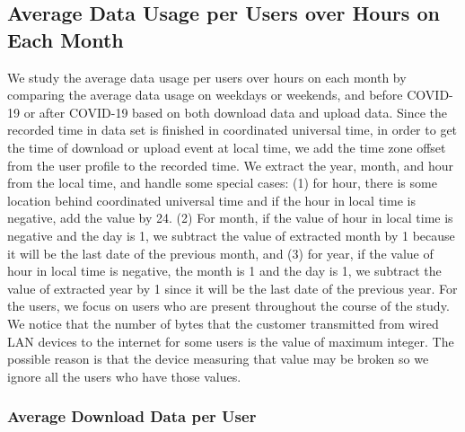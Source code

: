 \documentclass[conference,10pt]{IEEEtran}
\begin{document}
\subsection{Average Data Usage per Users over Hours on Each Month}
We study the average data usage per users over hours on each month by comparing the average data usage on weekdays or weekends, and before COVID-19 or after COVID-19 based on both download data and upload data. Since the recorded time in data set is finished in coordinated universal time, in order to get the time of download or upload event at local time, we add the time zone offset from the user profile to the recorded time.  We extract the year, month, and hour from the local time, and handle some special cases: (1) for hour, there is some location behind coordinated universal time and if the hour in local time is negative, add the value by 24. (2) For month, if the value of hour in local time is negative and the day is 1, we subtract the value of extracted month by 1 because it will be the last date of the previous month, and (3) for year, if the value of hour in local time is negative, the month is 1 and the day is 1, we subtract the value of extracted year by 1 since it will be the last date of the previous year. For the users, we focus on users who are present throughout the course of the study. We notice that the number of bytes that the customer transmitted from wired LAN devices to the internet for some users is the value of maximum integer. The possible reason is that the device measuring that value may be broken so we ignore all the users who have those values.



\subsubsection{Average Download Data per User}
\label{sec:download-data-per-user-over-hours}
\end{document}
